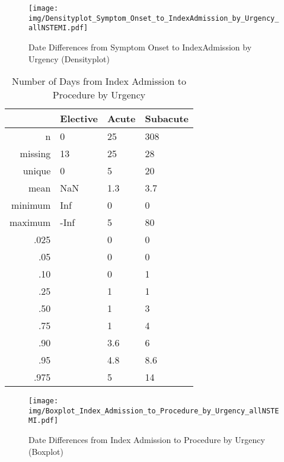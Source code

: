\documentclass[presentation,xcolor=pdftex,dvipsnames,table,11pt]{beamer}
\begin{document}
\begin{tiny}
\begin{frame}
\begin{figure}
  \centering
  \caption{Date Differences from Symptom Onset to IndexAdmission by Urgency (Densityplot)}
  \label{Density: Date Differences from Symptom Onset to IndexAdmission by Urgency}
\texttt{[image: img/Densityplot\_Symptom\_Onset\_to\_IndexAdmission\_by\_Urgency\_allNSTEMI.pdf]}\end{figure}
\end{frame}




\begin{table}[ht]
\centering
\begin{tabular}{rlll}
  \toprule
 & Elective & Acute & Subacute \\ 
  \midrule
n & 0 & 25 & 308 \\ 
  missing & 13 & 25 & 28 \\ 
  unique & 0 & 5 & 20 \\ 
  mean & NaN & 1.3 & 3.7 \\ 
  minimum & Inf & 0 & 0 \\ 
  maximum & -Inf & 5 & 80 \\ 
  .025 &  & 0 & 0 \\ 
  .05 &  & 0 & 0 \\ 
  .10 &  & 0 & 1 \\ 
  .25 &  & 1 & 1 \\ 
  .50 &  & 1 & 3 \\ 
  .75 &  & 1 & 4 \\ 
  .90 &  & 3.6 & 6 \\ 
  .95 &  & 4.8 & 8.6 \\ 
  .975 &  & 5 & 14 \\ 
   \bottomrule
\end{tabular}
\caption{Number of Days from Index Admission to Procedure by Urgency} 
\end{table}
\begin{frame}
\begin{figure}
  \centering
  \caption{Date Differences from Index Admission to Procedure by Urgency (Boxplot)}
  \label{Boxplot: Date Differences from Index Admission to Procedure by Urgency}
\texttt{[image: img/Boxplot\_Index\_Admission\_to\_Procedure\_by\_Urgency\_allNSTEMI.pdf]}\end{figure}
\end{frame}



\end{tiny}
\end{document}
